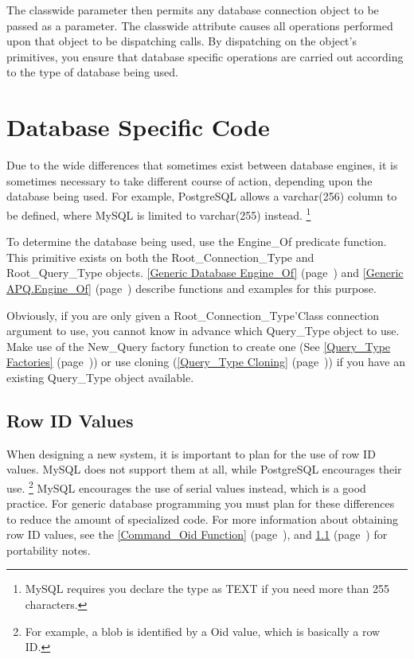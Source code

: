 \documentclass[english,letterpaper]{book}
\newcommand\Ref[1]{\textsection\ref{#1} (page~\pageref{#1})}
\begin{document}
The classwide parameter then permits any database connection object
to be passed as a parameter. The classwide attribute causes all operations
performed upon that object to be dispatching calls. By dispatching
on the object's primitives, you ensure that database specific operations
are carried out according to the type of database being used.


\section{Database Specific Code}

Due to the wide differences that sometimes exist between database
engines, it is sometimes necessary to take different course of action,
depending upon the database being used. For example, PostgreSQL allows
a varchar(256) column to be defined, where MySQL is limited to varchar(255)
instead.%
\footnote{MySQL requires you declare the type as TEXT if you need more than
255 characters.%
} 

To determine the database being used, use the Engine\_Of
predicate function. This primitive exists on both the Root\_Connection\_Type
and Root\_Query\_Type objects. \Ref{Generic Database Engine_Of}
and \Ref{Generic APQ.Engine_Of} describe functions and examples for
this purpose.

Obviously, if you are only given a Root\_Connection\_Type'Class connection
argument to use, you cannot know in advance which Query\_Type object
to use. Make use of the New\_Query factory function to create
one (See \Ref{Query_Type Factories}) or use cloning 
(\Ref{Query_Type Cloning}) if you have an existing Query\_Type object
available.


\subsection{Row ID Values}\label{Portability Note for Row ID Values}

When designing a new system, it is important to plan for the use of
row ID values. MySQL does not support them at all, while PostgreSQL
encourages their use.%
\footnote{For example, a blob is identified by a Oid value, which is basically
a row ID.%
} MySQL encourages the use of serial values instead, which is a good
practice. For generic database programming you must plan for these
differences to reduce the amount of specialized code. For more information
about obtaining row ID values, see the \Ref{Command_Oid Function},
and \Ref{Portability Note for Row ID Values} for portability
notes.
\end{document}
